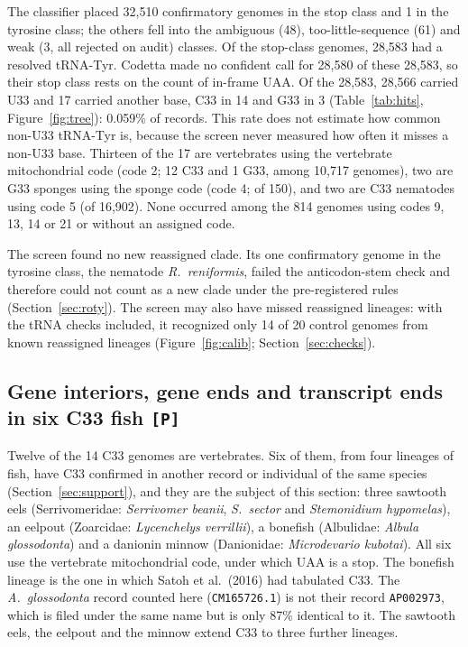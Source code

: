 \documentclass[11pt, a4paper]{article}
\begin{document}
The classifier placed 32,510 confirmatory genomes in the stop class and 1 in the tyrosine class; the others fell into the ambiguous (48), too-little-sequence (61) and weak (3, all rejected on audit) classes. Of the stop-class genomes, 28,583 had a resolved tRNA-Tyr. Codetta made no confident call for 28,580 of these 28,583, so their stop class rests on the count of in-frame UAA. Of the 28,583, 28,566 carried U33 and 17 carried another base, C33 in 14 and G33 in 3 (Table~\ref{tab:hits}, Figure~\ref{fig:tree}): 0.059\% of records. This rate does not estimate how common non-U33 tRNA-Tyr is, because the screen never measured how often it misses a non-U33 base. Thirteen of the 17 are vertebrates using the vertebrate mitochondrial code (code 2; 12 C33 and 1 G33, among 10,717 genomes), two are G33 sponges using the sponge code (code 4; of 150), and two are C33 nematodes using code 5 (of 16,902). None occurred among the 814 genomes using codes 9, 13, 14 or 21 or without an assigned code.

The screen found no new reassigned clade. Its one confirmatory genome in the tyrosine class, the nematode \textit{R.\ reniformis}, failed the anticodon-stem check and therefore could not count as a new clade under the pre-registered rules (Section~\ref{sec:roty}). The screen may also have missed reassigned lineages: with the tRNA checks included, it recognized only 14 of 20 control genomes from known reassigned lineages (Figure~\ref{fig:calib}; Section~\ref{sec:checks}).

\subsection{Gene interiors, gene ends and transcript ends in six C33 fish \texttt{[P]}}\label{sec:fish}
Twelve of the 14 C33 genomes are vertebrates. Six of them, from four lineages of fish, have C33 confirmed in another record or individual of the same species (Section~\ref{sec:support}), and they are the subject of this section: three sawtooth eels (Serrivomeridae: \textit{Serrivomer beanii}, \textit{S.\ sector} and \textit{Stemonidium hypomelas}), an eelpout (Zoarcidae: \textit{Lycenchelys verrillii}), a bonefish (Albulidae: \textit{Albula glossodonta}) and a danionin minnow (Danionidae: \textit{Microdevario kubotai}). All six use the vertebrate mitochondrial code, under which UAA is a stop. The bonefish lineage is the one in which Satoh et al.\ (2016) had tabulated C33. The \textit{A.\ glossodonta} record counted here (\texttt{CM165726.1}) is not their record \texttt{AP002973}, which is filed under the same name but is only 87\% identical to it. The sawtooth eels, the eelpout and the minnow extend C33 to three further lineages.
\end{document}
